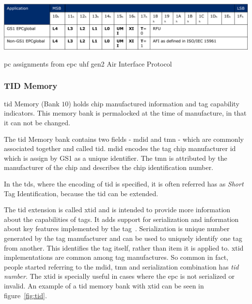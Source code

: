 \begin{table}
    \centering
    \includegraphics[width=\textwidth]{./figs/02-state-of-the-art/table_pcbits.pdf}
    \caption[\ac{pc} assignments from \ac{epc} \ac{uhf} \ac{gen2} Air Interface Protocol]{\ac{pc} assignments from \ac{epc} \ac{uhf} \ac{gen2} Air Interface Protocol~\cite{UHFGen2Tag}} 
    \label{tab:pcbits}
\end{table}

\subsubsection{TID Memory}

\ac{tid} Memory (Bank $10$) holds chip manufactured information and tag capability indicators. This memory bank is permalocked at the time of manufacture, in that it can not be changed.

The \ac{tid} Memory bank contains two fields - \ac{mdid} and \ac{tmn} - which are commonly associated together and called \ac{tid}.
\ac{mdid} encodes the tag chip manufacturer \ac{id} which is assign by GS1 as a unique identifier.
The \ac{tmn} is attributed by the manufacturer of the chip and describes the chip identification number.

In the \ac{tds}, where the encoding of \ac{tid} is specified, it is often referred has as \emph{Short} Tag Identification, because the \ac{tid} can be extended.

The \ac{tid} extension is called \ac{xtid} and is intended to provide more information about the capabilities of tags. It adds support for serialization and information about key features implemented by the tag~\cite{EPCTagData}.
Serialization is unique number generated by the tag manufacturer and can be used to uniquely identify one tag from another.
This identifies the tag itself, rather than item it is applied to.
\ac{xtid} implementations are common among tag manufactures. So common in fact, people started referring to the \ac{mdid}, \ac{tmn} and serialization  combination has \emph{\ac{tid} number}.
The \ac{xtid} is specially useful in cases where the \ac{epc} is not serialized or invalid.
An example of a \ac{tid} memory bank with \ac{xtid} can be seen in figure~\ref{fig:tid}.

